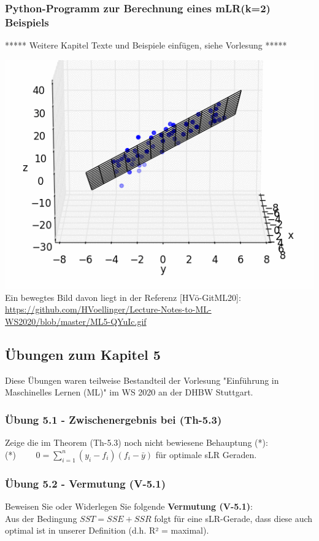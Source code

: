 \documentclass[12pt]{article}
\begin{document}
\subsubsection{Python-Programm zur Berechnung eines mLR(k=2) Beispiels}

{\color{red}
{***** Weitere Kapitel Texte und Beispiele einfügen, siehe Vorlesung *****}}


\includegraphics{ML5-MovingPicture_mLR}\\
%
Ein bewegtes Bild davon liegt in der Referenz [HVö-GitML20]: 
{\url{https://github.com/HVoellinger/Lecture-Notes-to-ML-WS2020/blob/master/ML5-QYuIc.gif}}

\subsection{Übungen zum Kapitel 5}
 
Diese Übungen waren teilweise Bestandteil der Vorlesung "Einführung in Maschinelles  Lernen (ML)" im WS 2020 an der DHBW Stuttgart.

\subsubsection{Übung 5.1 - Zwischenergebnis bei (Th-5.3)}

Zeige die im Theorem (Th-5.3) noch nicht bewiesene Behauptung (*):\\ [0.2cm]
(*) $ \qquad 0 = \sum_{i=1}^{n} (y_i - f_i)(f_i - \bar{y})$ für optimale sLR Geraden. 

\subsubsection{Übung 5.2 - Vermutung (V-5.1)}
Beweisen Sie oder Widerlegen Sie folgende \textbf{Vermutung (V-5.1)}:\\[0.2cm]
Aus der Bedingung $ SST = SSE + SSR $ folgt für eine sLR-Gerade, dass diese auch optimal ist in unserer Definition (d.h. R² = maximal).\\
\end{document}
